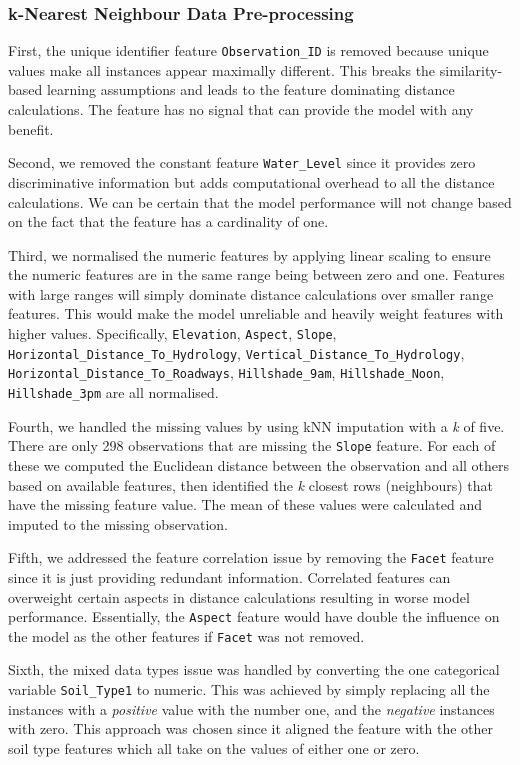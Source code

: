 \documentclass[conference]{IEEEtran}
\begin{document}
\subsubsection{k-Nearest Neighbour Data Pre-processing}
First, the unique identifier feature \texttt{Observation\_ID} is removed because unique values make all instances appear maximally different. This breaks the similarity-based learning assumptions and leads to the feature dominating distance calculations. The feature has no signal that can provide the model with any benefit.

Second, we removed the constant feature \texttt{Water\_Level} since it provides zero discriminative information but adds computational overhead to all the distance calculations. We can be certain that the model performance will not change based on the fact that the feature has a cardinality of one.

Third, we normalised the numeric features by applying linear scaling to ensure the numeric features are in the same range being between zero and one. Features with large ranges will simply dominate distance calculations over smaller range features. This would make the model unreliable and heavily weight features with higher values. Specifically, \texttt{Elevation}, \texttt{Aspect}, \texttt{Slope}, \texttt{Horizontal\_Distance\_To\_Hydrology}, \texttt{Vertical\_Distance\_To\_Hydrology}, \texttt{Horizontal\_Distance\_To\_Roadways}, \texttt{Hillshade\_9am}, \texttt{Hillshade\_Noon}, \texttt{Hillshade\_3pm}
 are all normalised.
 
 Fourth, we handled the missing values by using kNN imputation with a \textit{k} of five. There are only 298 observations that are missing the \texttt{Slope} feature. For each of these we computed the Euclidean distance between the observation and all others based on available features, then identified the \textit{k} closest rows (neighbours) that have the missing feature value. The mean of these values were calculated and imputed to the missing observation.
 
 Fifth, we addressed the feature correlation issue by removing the \texttt{Facet} feature since it is just providing redundant information. Correlated features can overweight certain aspects in distance calculations resulting in worse model performance. Essentially, the \texttt{Aspect} feature would have double the influence on the model as the other features if \texttt{Facet} was not removed.
 
 Sixth, the mixed data types issue was handled by converting the one categorical variable \texttt{Soil\_Type1} to numeric. This was achieved by simply replacing all the instances with a \textit{positive} value with the number one, and the \textit{negative} instances with zero. This approach was chosen since it aligned the feature with the other soil type features which all take on the values of either one or zero.
 
\end{document}
